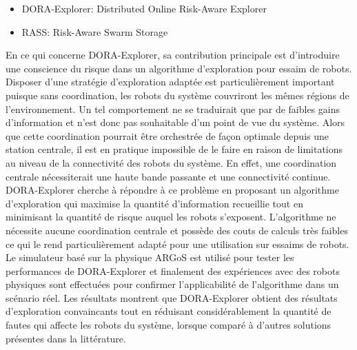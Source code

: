 \begin{itemize} 
\item DORA-Explorer: Distributed Online Risk-Aware Explorer
\item RASS: Risk-Aware Swarm Storage 
\end{itemize}

En ce qui concerne DORA-Explorer, sa contribution principale est d'introduire une conscience du risque dans un algorithme d'exploration pour essaim de robots. Disposer d'une stratégie d'exploration adaptée est particulièrement important puisque sans coordination, les robots du système couvriront les mêmes régions de l'environnement. Un tel comportement ne se traduirait que par de faibles gains d'information et n'est donc pas souhaitable d'un point de vue du système. Alors que cette coordination pourrait être orchestrée de façon optimale depuis une station centrale, il est en pratique impossible de le faire en raison de limitations au niveau de la connectivité des robots du système. En effet, une coordination centrale nécessiterait une haute bande passante et une connectivité continue. DORA-Explorer cherche à répondre à ce problème en proposant un algorithme d'exploration qui maximise la quantité d'information recueillie tout en minimisant la quantité de risque auquel les robots s'exposent. L'algorithme ne nécessite aucune coordination centrale et possède des couts de calculs très faibles ce qui le rend particulièrement adapté pour une utilisation sur essaims de robots. Le simulateur basé sur la physique ARGoS \cite{Pinciroli:SI2012} est utilisé pour tester les performances de DORA-Explorer et finalement des expériences avec des robots physiques sont effectuées pour confirmer l'applicabilité de l’algorithme dans un scénario réel. Les résultats montrent que DORA-Explorer obtient des résultats d'exploration convaincants tout en réduisant considérablement la quantité de fautes qui affecte les robots du système, lorsque comparé à d'autres solutions présentes dans la littérature.

